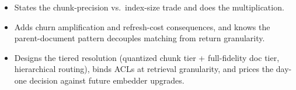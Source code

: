\begin{interviewq}
\goodgreat
\begin{itemize}
    \item {} States the chunk-precision vs.\ index-size trade and does the multiplication.
    \item {} Adds churn amplification and refresh-cost consequences, and knows the parent-document pattern decouples matching from return granularity.
    \item {} Designs the tiered resolution (quantized chunk tier + full-fidelity doc tier, hierarchical routing), binds ACLs at retrieval granularity, and prices the day-one decision against future embedder upgrades.
\end{itemize}

\end{interviewq}

